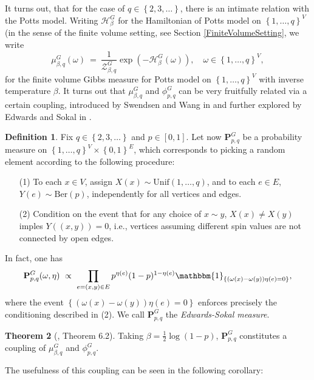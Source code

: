 \documentclass[12pt]{article}
\renewcommand{\H}{\mathcal{H}}
\newcommand{\PP}{\mathbf{P}}
\newcommand{\ZZ}{\mathcal{Z}}
\newcommand{\set}[1]{\left\{#1\right\}}
\newcommand{\1}{\mathbbm{1}}
\newcommand{\5}{\vspace{0.5cm}}
\theoremstyle{definition}
\newtheorem{thm}{Theorem}[section]
\newtheorem{df}[thm]{Definition}
\begin{document}
It turns out, that for the case of $q\in\set{2,3,\ldots}$, there is an intimate relation with the Potts model. Writing $\H_\beta^G$ for the Hamiltonian of Potts model on $\set{1,\ldots,q}^V$ (in the sense of the finite volume setting, see Section \ref{FiniteVolumeSetting}, we write
$$\mu_{\beta,q}^G(\omega) ~=~ \frac{1}{\ZZ_{\beta,q}^G}\exp(-\H_\beta^G(\omega)), \quad \omega\in\set{1,\ldots,q}^V,$$
for the finite volume Gibbs measure for Potts model on $\set{1,\ldots,q}^V$ with inverse temperature $\beta$. It turns out that $\mu_{\beta,q}^G$ and $\phi_{p,q}^G$ can be very fruitfully related via a certain coupling, introduced by Swendsen and Wang in \cite{SW} and further explored  by Edwards and Sokal in \cite{ES}.

\begin{df}\label{def:EdwardsSokal}
Fix $q\in\set{2,3,\ldots}$ and $p\in[0,1]$. Let now $\PP_{p,q}^G$ be a probability measure on $\set{1,\ldots,q}^V\times\set{0,1}^E$, which corresponds to picking a random element according to the following procedure:
\begin{itemize}
	\item[(1)] To each $x\in V$, assign $X(x)\sim\mathrm{Unif}(1,\ldots,q)$, and to each $e\in E$, $Y(e)\sim\mathrm{Ber}(p)$, independently for all vertices and edges.
	\item[(2)] Condition on the event that for any choice of $x\sim y$, $X(x)\neq X(y)$ imples $Y((x,y))=0$, i.e., vertices assuming different spin values are not connected by open edges.
\end{itemize}
In fact, one has
$$\PP_{p,q}^G(\omega,\eta) ~\propto~ \prod_{e=(x,y)\in E}p^{\eta(e)}(1-p)^{1-\eta(e)}\1_{\set{(\omega(x)-\omega(y))\eta(e)=0}},$$
where the event $\set{(\omega(x)-\omega(y))\eta(e)=0}$ enforces precisely the conditioning described in (2). We call $\PP_{p,q}^G$ the \textit{Edwards-Sokal measure}.
\end{df}

\begin{thm}[\cite{GHM}, Theorem 6.2]
Taking $\beta=\frac{1}{2}\log(1-p)$, $\PP_{p,q}^G$ constitutes a coupling of $\mu_{\beta,q}^G$ and $\phi_{p,q}^G$.	
\end{thm}

The usefulness of this coupling can be seen in the following corollary:
\end{document}
